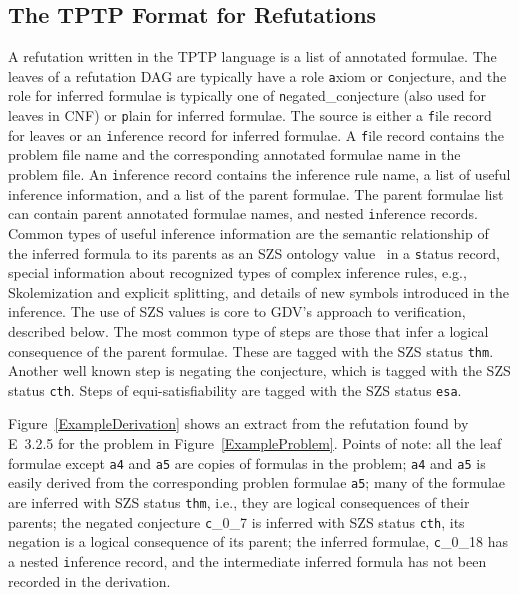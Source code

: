 \documentclass[runningheads]{llncs}
\newcommand{\smalltt}[1]{\small \texttt{#1}}
\begin{document}
\subsection{The TPTP Format for Refutations}
\label{Derivations}

A refutation written in the TPTP language is a list of annotated formulae. 
The leaves of a refutation DAG are typically have a role {\smalltt axiom} or {\smalltt conjecture}, 
and the role for inferred formulae is typically one of {\smalltt negated\_conjecture} (also used 
for leaves in CNF) or {\smalltt plain} for inferred formulae. 
The source is either a {\smalltt file} record for leaves or an {\smalltt inference} record for 
inferred formulae.
A {\smalltt file} record contains the problem file name and the corresponding annotated formulae 
name in the problem file.
An {\smalltt inference} record contains the inference rule name, a list of useful inference 
information, and a list of the parent formulae.
The parent formulae list can contain parent annotated formulae names, and nested 
{\smalltt inference} records.
Common types of useful inference information are the semantic relationship of the inferred formula 
to its parents as an SZS ontology value~\cite{Sut08-KEAPPA} in a {\smalltt status} record, 
special information about recognized types of complex inference rules, e.g., Skolemization and
explicit splitting, and details of new symbols introduced in the inference.
The use of SZS values is core to GDV's approach to verification, described below.
The most common type of steps are those that infer a logical consequence of the parent formulae.
These are tagged with the SZS status {\smalltt{thm}}.
Another well known step is negating the conjecture, which is tagged with the SZS status 
{\smalltt{cth}}.
Steps of equi-satisfiability are tagged with the SZS status {\smalltt{esa}}. 

Figure~\ref{ExampleDerivation} shows an extract from the refutation found by E~3.2.5 for the
problem in Figure~\ref{ExampleProblem}.
Points of note:
all the leaf formulae except {\tt a4} and {\tt a5} are copies of formulas in the problem;
{\tt a4} and {\tt a5} is easily derived from the corresponding problen formulae {\tt a5};
many of the formulae are inferred with SZS status {\smalltt{thm}}, i.e., they are logical 
consequences of their parents;
the negated conjecture {\smalltt c\_0\_7} is inferred with SZS status {\smalltt{cth}},
its negation is a logical consequence of its parent;
the inferred formulae, {\smalltt c\_0\_18} has a nested {\smalltt inference} record, and the 
intermediate inferred formula has not been recorded in the derivation. 
\end{document}

